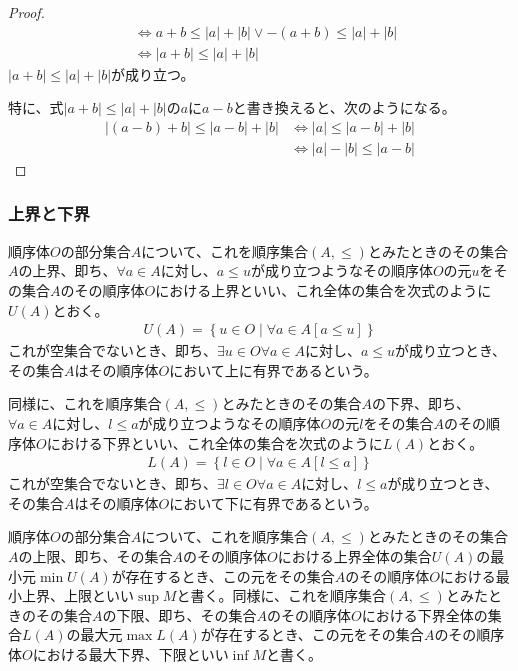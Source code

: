 \documentclass[dvipdfmx]{jsarticle}
\begin{document}
\begin{proof}
\begin{align*}
&\Leftrightarrow a + b \leq |a| + |b| \vee - (a + b) \leq |a| + |b|\\ 
&\Leftrightarrow |a + b| \leq |a| + |b|
\end{align*}
$|a + b| \leq |a| + |b|$が成り立つ。\par
特に、式$|a + b| \leq |a| + |b|$の$a$に$a - b$と書き換えると、次のようになる。
\begin{align*}
\left| (a - b) + b \right| \leq |a - b| + |b| &\Leftrightarrow |a| \leq |a - b| + |b|\\ 
&\Leftrightarrow |a| - |b| \leq |a - b|
\end{align*}
\end{proof}
\subsubsection{上界と下界}%
\begin{dfn}
順序体$O$の部分集合$A$について、これを順序集合$(A, \leq )$とみたときのその集合$A$の上界、即ち、$\forall a \in A$に対し、$a \leq u$が成り立つようなその順序体$O$の元$u$をその集合$A$のその順序体$O$における上界といい、これ全体の集合を次式のように$U(A)$とおく。
\begin{align*}
U(A) = \left\{ u \in O \middle| \forall a \in A[ a \leq u] \right\}
\end{align*}
これが空集合でないとき、即ち、$\exists u \in O\forall a \in A$に対し、$a \leq u$が成り立つとき、その集合$A$はその順序体$O$において上に有界であるという。\par
同様に、これを順序集合$(A, \leq )$とみたときのその集合$A$の下界、即ち、$\forall a \in A$に対し、$l \leq a$が成り立つようなその順序体$O$の元$l$をその集合$A$のその順序体$O$における下界といい、これ全体の集合を次式のように$L(A)$とおく。
\begin{align*}
L(A) = \left\{ l \in O \middle| \forall a \in A[ l \leq a] \right\}
\end{align*}
これが空集合でないとき、即ち、$\exists l \in O\forall a \in A$に対し、$l \leq a$が成り立つとき、その集合$A$はその順序体$O$において下に有界であるという。
\end{dfn}
\begin{dfn}
順序体$O$の部分集合$A$について、これを順序集合$(A, \leq )$とみたときのその集合$A$の上限、即ち、その集合$A$のその順序体$O$における上界全体の集合$U(A)$の最小元$\min{U(A)}$が存在するとき、この元をその集合$A$のその順序体$O$における最小上界、上限といい$\sup M$と書く。同様に、これを順序集合$(A, \leq )$とみたときのその集合$A$の下限、即ち、その集合$A$のその順序体$O$における下界全体の集合$L(A)$の最大元$\max{L(A)}$が存在するとき、この元をその集合$A$のその順序体$O$における最大下界、下限といい$\inf M$と書く。
\end{dfn}
\end{document}
